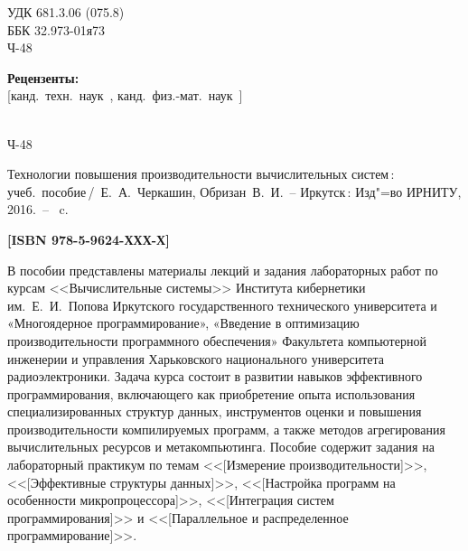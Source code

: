 \documentclass[14pt, a4paper, openany, twoside, draft]{extbook} %
\newcommand{\e}[2][fcolor]{\textcolor{pcolor}{[}\textcolor{#1}{#2}\textcolor{pcolor}{]}}
\begin{document}
\newpage
\begin{mygroup}
\thispagestyle{empty}
\noindent УДК 681.3.06 (075.8)\\ %
\noindent ББК 32.973-01я73\\ %
\noindent\mbox{}\hspace{2em}Ч-48 %
\vfill
\begin{center}\small
\textbf{Рецензенты:} \\
\e{канд.~техн.~наук~{\em }, канд.~физ.-мат.~наук~{\em }}
\end{center}
\vfill
\noindent\begin{minipage}[t]{2em}
\noindent\mbox{}\\
Ч-48
\end{minipage}%
\begin{minipage}[t]{0.95\linewidth}
\setlength{\parindent}{5ex}

Технологии повышения производительности вычислительных систем\,{}: учеб.~пособие\,/~Е.~А.~Черкашин, Обризан~В.~И.~-- Иркутск\,: Изд"=во ИРНИТУ, 2016.~-- \pageref{lastpage}~c.

{\bfseries \e{ISBN 978-5-9624-ХХХ-Х}}
\vspace{2ex}

\begingroup\small\parskip0pt
\vspace{1ex} В пособии представлены материалы лекций и задания лабораторных работ по курсам <<Вычислительные системы>> Института кибернетики им.~Е.~И.~Попова Иркутского государственного технического университета и «Многоядерное программирование», «Введение в оптимизацию производительности программного обеспечения» Факультета компьютерной инженерии и управления Харьковского национального университета радиоэлектроники.  Задача курса состоит в развитии навыков эффективного программирования, включающего как приобретение опыта использования специализированных структур данных, инструментов оценки и повышения производительности компилируемых программ, а также методов агрегирования вычислительных ресурсов и метакомпьютинга.  Пособие содержит задания на лабораторный практикум по темам <<\e{Измерение производительности}>>, <<\e{Эффективные структуры данных}>>, <<\e{Настройка программ на особенности микропроцессора}>>, <<\e{Интеграция систем программирования}>> и <<\e{Параллельное и распределенное программирование}>>.


\end{minipage}
\end{mygroup}
\end{document}
